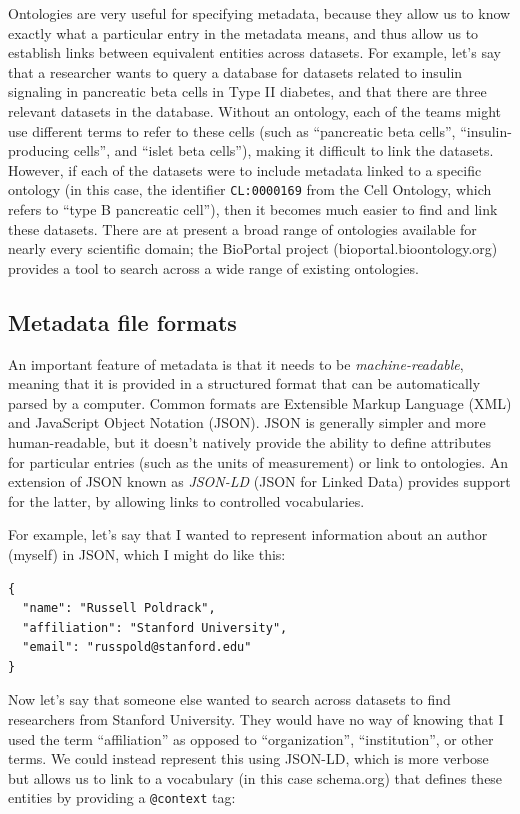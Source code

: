 Ontologies are very useful for specifying metadata, because they allow us to know exactly what a particular entry in the metadata means, and thus allow us to establish links between equivalent entities across datasets.  For example, let's say that a researcher wants to query a database for datasets related to insulin signaling in pancreatic beta cells in Type II diabetes, and that there are three relevant datasets in the database.  Without an ontology, each of the teams might use different terms to refer to these cells (such as ``pancreatic beta cells'', ``insulin-producing cells'', and ``islet beta cells''), making it difficult to link the datasets. However, if each of the datasets were to include metadata linked to a specific ontology (in this case, the identifier \texttt{CL:0000169} from the Cell Ontology, which refers to ``type B pancreatic cell''), then it becomes much easier to find and link these datasets.  There are at present a broad range of ontologies available for nearly every scientific domain; the BioPortal project (bioportal.bioontology.org) provides a tool to search across a wide range of existing ontologies.

\subsection{Metadata file formats}

An important feature of metadata is that it needs to be \textit{machine-readable}, meaning that it is provided in a structured format that can be automatically parsed by a computer.  Common formats are Extensible Markup Language (XML) and JavaScript Object Notation (JSON).  JSON is generally simpler and more human-readable, but it doesn't natively provide the ability to define attributes for particular entries (such as the units of measurement) or link to ontologies.  An extension of JSON known as \textit{JSON-LD} (JSON for Linked Data) provides support for the latter, by allowing links to controlled vocabularies.

For example, let's say that I wanted to represent information about an author (myself) in JSON, which I might do like this:

\begin{lstlisting}[style=jsonshort]
{
  "name": "Russell Poldrack",
  "affiliation": "Stanford University",
  "email": "russpold@stanford.edu"
}
\end{lstlisting}

Now let's say that someone else wanted to search across datasets to find researchers from Stanford University. They would have no way of knowing that I used the term ``affiliation'' as opposed to ``organization'', ``institution'', or other terms.  We could instead represent this using JSON-LD, which is more verbose but allows us to link to a vocabulary (in this case schema.org) that defines these entities by providing a \texttt{@context} tag:

